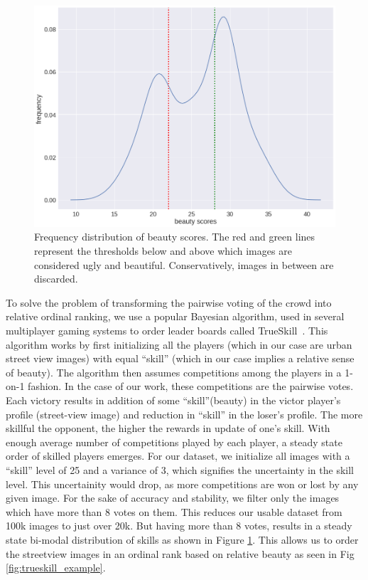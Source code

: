 \begin{figure}[t!]
    \centering
    \includegraphics[width=0.7\columnwidth]{Trueskill.png}
    \caption{Frequency distribution of beauty scores. The red and green lines represent the thresholds below and above which images are considered ugly and beautiful. Conservatively, images in between are discarded.}
    \label{fig:Trueskill}
\end{figure}
To solve the problem of transforming the pairwise voting of the crowd into relative ordinal ranking, we use a popular Bayesian algorithm, used in several multiplayer gaming systems to order leader boards called TrueSkill~\cite{herbrich2007trueskill}. This algorithm works by first initializing all the players (which in our case are urban street view images) with equal ``skill'' (which in our case implies a relative sense of beauty).
The algorithm then assumes competitions among the players in a 1-on-1 fashion. In the case of our work, these competitions are the pairwise votes. Each victory results in addition of some ``skill''(beauty) in the victor player's profile (street-view image) and reduction in ``skill'' in the loser's profile. The more skillful the opponent, the higher the rewards in update of one's skill. With enough average number of competitions played by each player, a steady state order of skilled players emerges. For our dataset, we initialize all images with a ``skill'' level of 25 and a variance of 3, which signifies the uncertainty in the skill level. This uncertainity would drop, as more competitions are won or lost by any given image. For the sake of accuracy and stability, we filter only the images which have more than 8 votes on them. This reduces our usable dataset from 100k images to just over 20k. But having more than 8 votes, results in a steady state bi-modal distribution of skills as shown in Figure \ref{fig:Trueskill}. This allows us to order the streetview images in an ordinal rank based on relative beauty as seen in Fig \ref{fig:trueskill_example}. 


